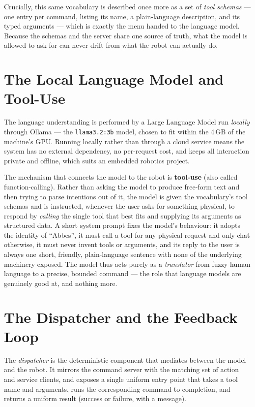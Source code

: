 Crucially, this same vocabulary is described once more as a set of
\emph{tool schemas} --- one entry per command, listing its name, a
plain-language description, and its typed arguments --- which is exactly
the menu handed to the language model. Because the schemas and the server
share one source of truth, what the model is allowed to ask for can never
drift from what the robot can actually do.

\section{The Local Language Model and Tool-Use}
\label{sec:ai-llm}
The language understanding is performed by a Large Language Model run
\emph{locally} through Ollama --- the \texttt{llama3.2:3b} model, chosen to
fit within the 4\,GB of the machine's GPU. Running locally rather than
through a cloud service means the system has no external dependency, no
per-request cost, and keeps all interaction private and offline, which
suits an embedded robotics project.

The mechanism that connects the model to the robot is \textbf{tool-use}
(also called function-calling). Rather than asking the model to produce
free-form text and then trying to parse intentions out of it, the model is
given the vocabulary's tool schemas and is instructed, whenever the user
asks for something physical, to respond by \emph{calling} the single tool
that best fits and supplying its arguments as structured data. A short
system prompt fixes the model's behaviour: it adopts the identity of
``Abbes'', it must call a tool for any physical request and only chat
otherwise, it must never invent tools or arguments, and its reply to the
user is always one short, friendly, plain-language sentence with none of
the underlying machinery exposed. The model thus acts purely as a
\emph{translator} from fuzzy human language to a precise, bounded command
--- the role that language models are genuinely good at, and nothing more.

\section{The Dispatcher and the Feedback Loop}
\label{sec:ai-dispatcher}
The \emph{dispatcher} is the deterministic component that mediates between
the model and the robot. It mirrors the command server with the matching
set of action and service clients, and exposes a single uniform entry
point that takes a tool name and arguments, runs the corresponding command
to completion, and returns a uniform result (success or failure, with a
message).

